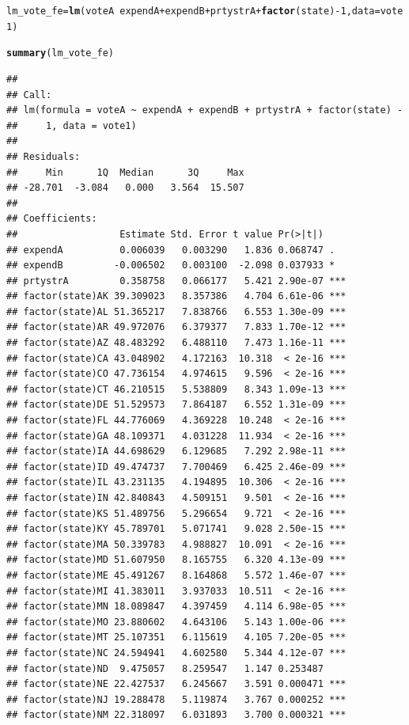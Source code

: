 \documentclass[12pt]{article}\usepackage[]{graphicx}\usepackage[]{color}
\makeatletter
\newcommand{\hlnum}[1]{\textcolor[rgb]{0.686,0.059,0.569}{#1}}%
\newcommand{\hlopt}[1]{\textcolor[rgb]{0,0,0}{#1}}%
\newcommand{\hlstd}[1]{\textcolor[rgb]{0.345,0.345,0.345}{#1}}%
\newcommand{\hlkwb}[1]{\textcolor[rgb]{0.69,0.353,0.396}{#1}}%
\newcommand{\hlkwc}[1]{\textcolor[rgb]{0.333,0.667,0.333}{#1}}%
\newcommand{\hlkwd}[1]{\textcolor[rgb]{0.737,0.353,0.396}{\textbf{#1}}}%
\newenvironment{kframe}{%
 \def\at@end@of@kframe{}%
 \ifinner\ifhmode%
  \def\at@end@of@kframe{\end{minipage}}%
  \begin{minipage}{\columnwidth}%
 \fi\fi%
 \def\FrameCommand##1{\hskip\@totalleftmargin \hskip-\fboxsep
 \colorbox{shadecolor}{##1}\hskip-\fboxsep
     \hskip-\linewidth \hskip-\@totalleftmargin \hskip\columnwidth}%
 \MakeFramed {\advance\hsize-\width
   \@totalleftmargin\z@ \linewidth\hsize
   \@setminipage}}%
 {\par\unskip\endMakeFramed%
 \at@end@of@kframe}
\newenvironment{knitrout}{}{} %
\makeatother
\begin{document}
\begin{knitrout}
\begin{kframe}
\begin{alltt}
\hlstd{lm_vote_fe} \hlkwb{=} \hlkwd{lm}\hlstd{(voteA} \hlopt{~} \hlstd{expendA} \hlopt{+} \hlstd{expendB} \hlopt{+} \hlstd{prtystrA} \hlopt{+} \hlkwd{factor}\hlstd{(state)} \hlopt{-} \hlnum{1}\hlstd{,} \hlkwc{data} \hlstd{= vote1)}

\hlkwd{summary}\hlstd{(lm_vote_fe)}
\end{alltt}
\begin{verbatim}
## 
## Call:
## lm(formula = voteA ~ expendA + expendB + prtystrA + factor(state) - 
##     1, data = vote1)
## 
## Residuals:
##     Min      1Q  Median      3Q     Max 
## -28.701  -3.084   0.000   3.564  15.507 
## 
## Coefficients:
##                  Estimate Std. Error t value Pr(>|t|)    
## expendA          0.006039   0.003290   1.836 0.068747 .  
## expendB         -0.006502   0.003100  -2.098 0.037933 *  
## prtystrA         0.358758   0.066177   5.421 2.90e-07 ***
## factor(state)AK 39.309023   8.357386   4.704 6.61e-06 ***
## factor(state)AL 51.365217   7.838766   6.553 1.30e-09 ***
## factor(state)AR 49.972076   6.379377   7.833 1.70e-12 ***
## factor(state)AZ 48.483292   6.488110   7.473 1.16e-11 ***
## factor(state)CA 43.048902   4.172163  10.318  < 2e-16 ***
## factor(state)CO 47.736154   4.974615   9.596  < 2e-16 ***
## factor(state)CT 46.210515   5.538809   8.343 1.09e-13 ***
## factor(state)DE 51.529573   7.864187   6.552 1.31e-09 ***
## factor(state)FL 44.776069   4.369228  10.248  < 2e-16 ***
## factor(state)GA 48.109371   4.031228  11.934  < 2e-16 ***
## factor(state)IA 44.698629   6.129685   7.292 2.98e-11 ***
## factor(state)ID 49.474737   7.700469   6.425 2.46e-09 ***
## factor(state)IL 43.231135   4.194895  10.306  < 2e-16 ***
## factor(state)IN 42.840843   4.509151   9.501  < 2e-16 ***
## factor(state)KS 51.489756   5.296654   9.721  < 2e-16 ***
## factor(state)KY 45.789701   5.071741   9.028 2.50e-15 ***
## factor(state)MA 50.339783   4.988827  10.091  < 2e-16 ***
## factor(state)MD 51.607950   8.165755   6.320 4.13e-09 ***
## factor(state)ME 45.491267   8.164868   5.572 1.46e-07 ***
## factor(state)MI 41.383011   3.937033  10.511  < 2e-16 ***
## factor(state)MN 18.089847   4.397459   4.114 6.98e-05 ***
## factor(state)MO 23.880602   4.643106   5.143 1.00e-06 ***
## factor(state)MT 25.107351   6.115619   4.105 7.20e-05 ***
## factor(state)NC 24.594941   4.602580   5.344 4.12e-07 ***
## factor(state)ND  9.475057   8.259547   1.147 0.253487    
## factor(state)NE 22.427537   6.245667   3.591 0.000471 ***
## factor(state)NJ 19.288478   5.119874   3.767 0.000252 ***
## factor(state)NM 22.318097   6.031893   3.700 0.000321 ***

\end{verbatim}
\end{kframe}
\end{knitrout}
\end{document}
